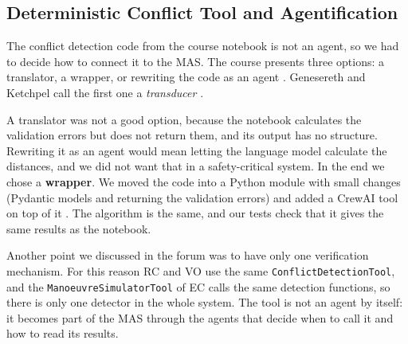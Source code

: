 \subsection{Deterministic Conflict Tool and Agentification}
\label{sec:agentification}

The conflict detection code from the course notebook is not an agent, so we had to decide
how to connect it to the MAS. The course presents three options: a translator, a wrapper,
or rewriting the code as an agent \cite{lecture3}. Genesereth and Ketchpel call the first
one a \emph{transducer} \cite{genesereth1994}.

A translator was not a good option, because the notebook calculates the validation errors
but does not return them, and its output has no structure. Rewriting it as an agent would
mean letting the language model calculate the distances, and we did not want that in a
safety-critical system. In the end we chose a \textbf{wrapper}. We moved the code into a
Python module with small changes (Pydantic models and returning the validation errors)
and added a CrewAI tool on top of it \cite{crewai_docs}. The algorithm is the same, and our
tests check that it gives the same results as the notebook.

Another point we discussed in the forum was to have only one verification mechanism. For
this reason RC and VO use the same \texttt{ConflictDetectionTool}, and the
\texttt{ManoeuvreSimulatorTool} of EC calls the same detection functions, so there is only
one detector in the whole system. The tool is not an agent by itself: it becomes part of
the MAS through the agents that decide when to call it and how to read its results.
